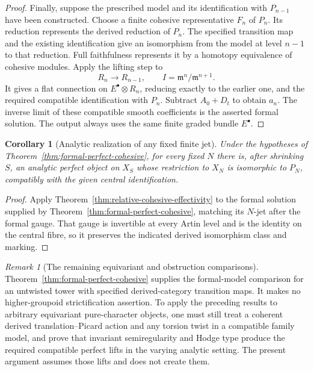 \documentclass[11pt]{article}
\newtheorem{corollary}[theorem]{Corollary}
\theoremstyle{definition}
\theoremstyle{remark}
\newtheorem{remark}[theorem]{Remark}
\begin{document}
\begin{proof}
Finally, suppose the prescribed model and its identification
with $P_{n-1}$ have been constructed.  Choose a finite cohesive
representative $F_n$ of $P_n$.  Its reduction represents the
derived reduction of $P_n$.  The specified transition map and
the existing identification give an isomorphism from the model
at level $n-1$ to that reduction.  Full faithfulness represents
it by a homotopy equivalence of cohesive modules.  Apply the
lifting step to
\[
 R_n\longrightarrow R_{n-1},\qquad
 I=\mathfrak m^n/\mathfrak m^{n+1}.
\]
It gives a flat connection on $E^\bullet\otimes R_n$, reducing
exactly to the earlier one, and the required compatible
identification with $P_n$.  Subtract $A_0+D_t$ to obtain $a_n$.
The inverse limit of these compatible smooth coefficients is
the asserted formal solution.  The output always uses the same
finite graded bundle $E^\bullet$.
\end{proof}

\begin{corollary}[Analytic realization of any fixed finite jet]
\label{cor:formal-perfect-analytic-jet}
Under the hypotheses of Theorem~\ref{thm:formal-perfect-cohesive},
for every fixed $N$ there is, after shrinking $S$, an analytic
perfect object on $X_S$ whose restriction to $X_N$ is isomorphic
to $P_N$, compatibly with the given central identification.
\end{corollary}

\begin{proof}
Apply Theorem~\ref{thm:relative-cohesive-effectivity} to the
formal solution supplied by
Theorem~\ref{thm:formal-perfect-cohesive}, matching its $N$-jet
after the formal gauge.  That gauge is invertible at every
Artin level and is the identity on the central fibre, so it
preserves the indicated derived isomorphism class and marking.
\end{proof}

\begin{remark}[The remaining equivariant and obstruction comparisons]
\label{rem:formal-perfect-remaining}
Theorem~\ref{thm:formal-perfect-cohesive} supplies the formal-model
comparison for an untwisted tower with specified derived-category
transition maps.  It makes no higher-groupoid strictification
assertion.  To apply the preceding results to arbitrary
equivariant pure-character objects, one must still treat a
coherent derived translation--Picard action and any torsion
twist in a compatible family model, and prove that invariant
semiregularity and Hodge type produce the required compatible
perfect lifts in the varying analytic setting.  The present
argument assumes those lifts and does not create them.
\end{remark}
\end{document}
